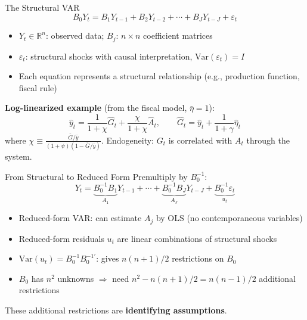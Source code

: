 \documentclass[blue]{beamer}
\begin{document}
\begin{frame}{The Structural VAR}
	\[
	B_0 Y_t = B_1 Y_{t-1} + B_2 Y_{t-2} + \cdots + B_J Y_{t-J} + \varepsilon_t
	\]
	
	\begin{itemize}
		\item $Y_t \in \mathbb{R}^n$: observed data; $B_j$: $n \times n$ coefficient matrices
		\item $\varepsilon_t$: structural shocks with causal interpretation, $\text{Var}(\varepsilon_t) = I$
		\item Each equation represents a structural relationship (e.g., production function, fiscal rule)
	\end{itemize}
	
	\bigskip
	\textbf{Log-linearized example} (from the fiscal model, $\bar{\eta} = 1$):
	\[
	\hat{y}_t = \frac{1}{1+\chi} \hat{G}_t + \frac{\chi}{1+\chi} \hat{A}_t, \qquad \hat{G}_t = \hat{y}_t + \frac{1}{1+\gamma} \hat{\eta}_t
	\]
	where $\chi \equiv \frac{\bar{G}/\bar{y}}{(1+\psi)(1-\bar{G}/\bar{y})}$. Endogeneity: $G_t$ is correlated with $A_t$ through the system.
\end{frame}

\begin{frame}{From Structural to Reduced Form}
	Premultiply by $B_0^{-1}$:
	\[
	Y_t = \underbrace{B_0^{-1} B_1}_{A_1} Y_{t-1} + \cdots + \underbrace{B_0^{-1} B_J}_{A_J} Y_{t-J} + \underbrace{B_0^{-1} \varepsilon_t}_{u_t}
	\]
	
	\begin{itemize}
		\item Reduced-form VAR: can estimate $A_j$ by OLS (no contemporaneous variables)
		\item Reduced-form residuals $u_t$ are linear combinations of structural shocks
		\item $\text{Var}(u_t) = B_0^{-1} B_0^{-1\prime}$: gives $n(n+1)/2$ restrictions on $B_0$
		\item $B_0$ has $n^2$ unknowns $\Rightarrow$ need $n^2 - n(n+1)/2 = n(n-1)/2$ additional restrictions
	\end{itemize}
	
	These additional restrictions are \textbf{identifying assumptions}.
\end{frame}
\end{document}
